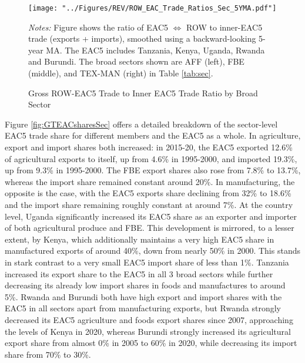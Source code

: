 \documentclass[a4paper]{article}
\begin{document}
\begin{figure}[h!]
\centering
\caption{\label{fig:EAC_ROW_Ratios_Sec} Gross ROW-EAC5 Trade to Inner EAC5 Trade Ratio by Broad Sector}
\texttt{[image: "../Figures/REV/ROW\_EAC\_Trade\_Ratios\_Sec\_5YMA.pdf"]}
\raggedright
\scriptsize 
\emph{Notes:} Figure shows the ratio of EAC5 $\Leftrightarrow$ ROW to inner-EAC5 trade (exports + imports), smoothed using a backward-looking 5-year MA. The EAC5 includes Tanzania, Kenya, Uganda, Rwanda and Burundi. The broad sectors shown are AFF (left), FBE (middle), and TEX-MAN (right) in Table \ref{tab:sec}.
\end{figure}

\newpage

Figure \ref{fig:GTEACsharesSec} offers a detailed breakdown of the sector-level EAC5 trade share for different members and the EAC5 as a whole. In agriculture, export and import shares both increased: in 2015-20, the EAC5 exported 12.6\% of agricultural exports to itself, up from 4.6\% in 1995-2000, and imported 19.3\%, up from 9.3\% in 1995-2000. The FBE export shares also rose from 7.8\% to 13.7\%, whereas the import share remained constant around 20\%. In manufacturing, the opposite is the case, with the EAC5 exports share declining from 32\% to 18.6\% and the import share remaining roughly constant at around 7\%. At the country level, Uganda significantly increased its EAC5 share as an exporter and importer of both agricultural produce and FBE. This development is mirrored, to a lesser extent, by Kenya, which additionally maintains a very high EAC5 share in manufactured exports of around 40\%, down from nearly 50\% in 2000. This stands in stark contrast to a very small EAC5 import share of less than 1\%. Tanzania increased its export share to the EAC5 in all 3 broad sectors while further decreasing its already low import shares in foods and manufactures to around 5\%. Rwanda and Burundi both have high export and import shares with the EAC5 in all sectors apart from manufacturing exports, but Rwanda strongly decreased its EAC5 agriculture and foods export shares since 2007, approaching the levels of Kenya in 2020, whereas Burundi strongly increased its agricultural export share from almost 0\% in 2005 to 60\% in 2020, while decreasing its import share from 70\% to 30\%. \newline 
\end{document}
